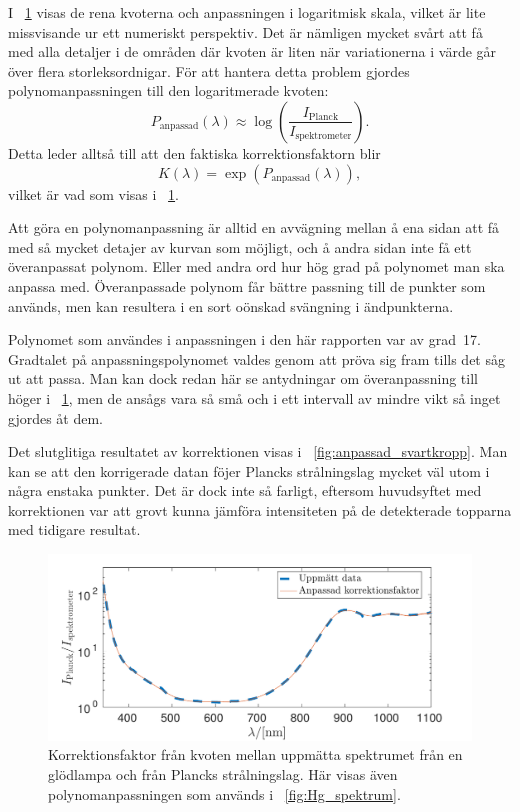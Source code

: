 \documentclass[11pt,a4paper]{article}
\newcommand{\figref}{\figurename~\ref}
\begin{document}
I \figref{fig:korrektionsfaktor} visas de rena kvoterna och
anpassningen i logaritmisk skala, vilket är lite missvisande ur ett
numeriskt perspektiv. Det är nämligen mycket svårt att få med alla
detaljer i de områden där kvoten är liten när variationerna i värde
går över flera storleksordnigar. För att hantera detta problem gjordes
polynomanpassningen till den logaritmerade kvoten: 
\[
P_\text{anpassad} (\lambda) 
\approx \log(\frac{I_\text{Planck}}{I_\text{spektrometer}}).
\]
Detta leder alltså till att den faktiska korrektionsfaktorn blir
\[
K(\lambda) = \exp(P_\text{anpassad}(\lambda)),
\]
vilket är vad som visas i \figref{fig:korrektionsfaktor}.

Att göra en polynomanpassning är alltid en avvägning mellan å ena
sidan att få med så mycket detajer av kurvan som möjligt, och å andra
sidan inte få ett överanpassat polynom. Eller med andra ord hur hög
grad på polynomet man ska anpassa med. Överanpassade polynom får
bättre passning till de punkter som används, men kan resultera i en
sort oönskad svängning i ändpunkterna. 

Polynomet som användes i anpassningen i den här rapporten var av
grad~17. Gradtalet på anpassningspolynomet valdes genom att pröva sig
fram tills det såg ut att passa. Man kan dock redan här se antydningar
om överanpassning till höger i \figref{fig:korrektionsfaktor}, men de
ansågs vara så små och i ett intervall av mindre vikt så inget gjordes
åt dem. 

Det slutglitiga resultatet av korrektionen visas i
\figref{fig:anpassad_svartkropp}. Man kan se att den korrigerade datan
föjer Plancks strålningslag mycket väl utom i några enstaka
punkter. Det är dock inte så farligt, eftersom huvudsyftet med
korrektionen var att grovt kunna jämföra intensiteten på de
detekterade topparna med tidigare resultat. 

\begin{figure}\centering
\centerline{ %
\includegraphics[width=.8\textwidth]{korrektionsfaktor.pdf}
}
\caption{Korrektionsfaktor från kvoten mellan uppmätta spektrumet från
en glödlampa och från Plancks strålningslag. Här visas även
polynomanpassningen som används i \figref{fig:Hg_spektrum}.}
\label{fig:korrektionsfaktor}
\end{figure}
\end{document}
